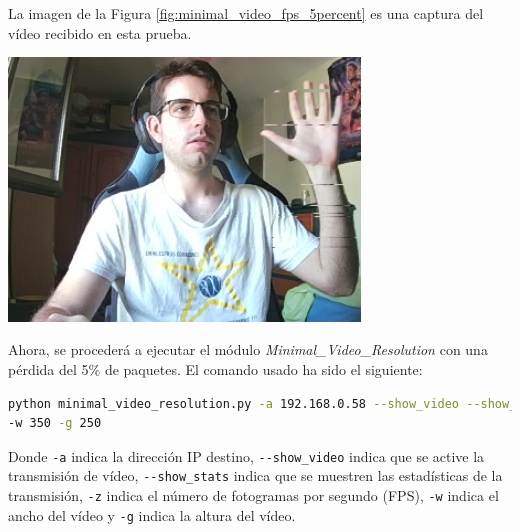 \newpage
La imagen de la Figura \ref{fig:minimal_video_fps_5percent} es una captura del vídeo recibido en esta prueba.
\begin{center}
  \includegraphics[width = 0.7\textwidth]{images/VideoRecibido7.2.png}
  \label{fig:minimal_video_fps_5percent}
\end{center}
\newpage


Ahora, se procederá a ejecutar el módulo \textit{Minimal\_Video\_Resolution} con una pérdida del 5\% de paquetes. El comando usado ha sido el siguiente:

\begin{lstlisting}[language=bash,basicstyle=\ttfamily\scriptsize]
python minimal_video_resolution.py -a 192.168.0.58 --show_video --show_stats -z 12 \\
-w 350 -g 250
\end{lstlisting}
Donde \verb|-a| indica la dirección IP destino, \verb|--show_video| indica que se active la transmisión de vídeo, \verb|--show_stats| indica que se muestren las estadísticas de la transmisión, \verb|-z| indica el número de fotogramas por segundo (FPS), \verb|-w| indica el ancho del vídeo y \verb|-g| indica la altura del vídeo.
\vspace{\baselineskip}

